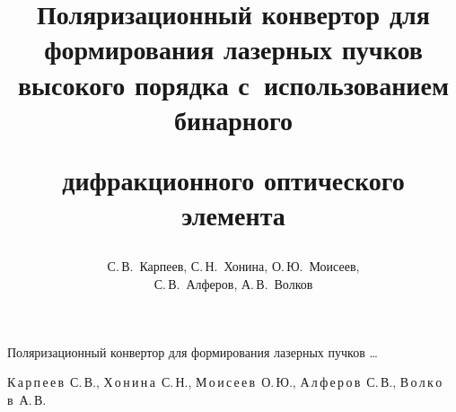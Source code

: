 %

%

%

%

%





\renewcommand{\firstpage}{162}

\renewcommand{\lastpage}{170}









\title{Поляризационный конвертор для формирования лазерных пучков высокого порядка с~использованием бинарного

дифракционного оптического элемента}

{Поляризационный конвертор для формирования лазерных пучков \dots}



\author{С.\,В.~Карпеев, С.\,Н.~Хонина, О.\,Ю.~Моисеев, \\

С.\,В.~Алферов, А.\,В.~Волков}{К\,а\,р\,п\,е\,е\,в~С.\,В., Х\,о\,н\,и\,н\,а~С.\,Н., М\,о\,и\,с\,е\,е\,в~О.\,Ю., А\,л\,ф\,е\,р\,о\,в~С.\,В., В\,о\,л\,\-к\,о\,в~А.\,В.}









